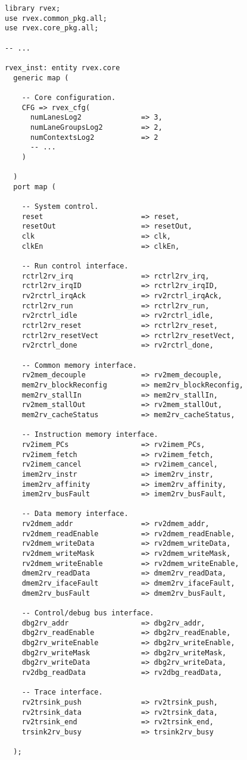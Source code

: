 \begin{lstlisting}[numbers=none, basicstyle=\tiny]
library rvex;
use rvex.common_pkg.all;
use rvex.core_pkg.all;

-- ...

rvex_inst: entity rvex.core
  generic map (
    
    -- Core configuration.
    CFG => rvex_cfg(
      numLanesLog2              => 3,
      numLaneGroupsLog2         => 2,
      numContextsLog2           => 2
      -- ...
    )
    
  )
  port map (
    
    -- System control.
    reset                       => reset,
    resetOut                    => resetOut,
    clk                         => clk,
    clkEn                       => clkEn,
    
    -- Run control interface.
    rctrl2rv_irq                => rctrl2rv_irq,
    rctrl2rv_irqID              => rctrl2rv_irqID,
    rv2rctrl_irqAck             => rv2rctrl_irqAck,
    rctrl2rv_run                => rctrl2rv_run,
    rv2rctrl_idle               => rv2rctrl_idle,
    rctrl2rv_reset              => rctrl2rv_reset,
    rctrl2rv_resetVect          => rctrl2rv_resetVect,
    rv2rctrl_done               => rv2rctrl_done,
    
    -- Common memory interface.
    rv2mem_decouple             => rv2mem_decouple,
    mem2rv_blockReconfig        => mem2rv_blockReconfig,
    mem2rv_stallIn              => mem2rv_stallIn,
    rv2mem_stallOut             => rv2mem_stallOut,
    mem2rv_cacheStatus          => mem2rv_cacheStatus,
    
    -- Instruction memory interface.
    rv2imem_PCs                 => rv2imem_PCs,
    rv2imem_fetch               => rv2imem_fetch,
    rv2imem_cancel              => rv2imem_cancel,
    imem2rv_instr               => imem2rv_instr,
    imem2rv_affinity            => imem2rv_affinity,
    imem2rv_busFault            => imem2rv_busFault,
    
    -- Data memory interface.
    rv2dmem_addr                => rv2dmem_addr,
    rv2dmem_readEnable          => rv2dmem_readEnable,
    rv2dmem_writeData           => rv2dmem_writeData,
    rv2dmem_writeMask           => rv2dmem_writeMask,
    rv2dmem_writeEnable         => rv2dmem_writeEnable,
    dmem2rv_readData            => dmem2rv_readData,
    dmem2rv_ifaceFault          => dmem2rv_ifaceFault,
    dmem2rv_busFault            => dmem2rv_busFault,
    
    -- Control/debug bus interface.
    dbg2rv_addr                 => dbg2rv_addr,
    dbg2rv_readEnable           => dbg2rv_readEnable,
    dbg2rv_writeEnable          => dbg2rv_writeEnable,
    dbg2rv_writeMask            => dbg2rv_writeMask,
    dbg2rv_writeData            => dbg2rv_writeData,
    rv2dbg_readData             => rv2dbg_readData,
    
    -- Trace interface.
    rv2trsink_push              => rv2trsink_push,
    rv2trsink_data              => rv2trsink_data,
    rv2trsink_end               => rv2trsink_end,
    trsink2rv_busy              => trsink2rv_busy
    
  );

\end{lstlisting}

